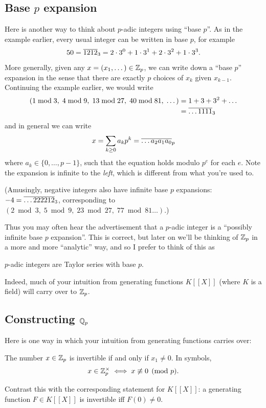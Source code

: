 \subsection{Base $p$ expansion}
Here is another way to think about $p$-adic integers using ``base $p$''.
As in the example earlier, every usual integer can be written in base $p$,
for example
\[ 50 = \overline{1212}_3 = 2 \cdot 3^0 + 1 \cdot 3^1 + 2 \cdot 3^2 + 1 \cdot 3^3. \]
More generally, given any $x = (x_1, \dots) \in \mathbb Z_p$,
we can write down a ``base $p$'' expansion in the sense
that there are exactly $p$ choices of $x_k$ given $x_{k-1}$.
Continuing the example earlier, we would write
\begin{align*}
	\left( 1 \bmod 3, \; 4 \bmod 9, \;
	13 \bmod{27}, \; 40 \bmod{81}, \; \dots \right)
	&= 1 + 3 + 3^2 + \dots \\
	&= \overline{\dots1111}_3
\end{align*}
and in general we can write
\[ x = \sum_{k \ge 0} a_k p^k = \overline{\dots a_2 a_1 a_0}_p \]
where $a_k \in \{0, \dots, p-1\}$,
such that the equation holds modulo $p^e$ for each $e$.
Note the expansion is infinite to the \emph{left},
which is different from what you're used to.

(Amusingly, negative integers also have infinite base $p$ expansions:
$-4 = \overline{\dots222212}_3$, corresponding to
$(2 \bmod 3, \; 5 \bmod 9, \; 23 \bmod{27}, \; 77 \bmod{81} \dots)$.)

Thus you may often hear the advertisement that a $p$-adic integer
is a ``possibly infinite base $p$ expansion''.
This is correct, but later on we'll be thinking of $\mathbb Z_p$ in
a more and more ``analytic'' way,
and so I prefer to think of this as
\begin{moral}
	$p$-adic integers are Taylor series with base $p$.
\end{moral}
Indeed, much of your intuition from generating functions $K[[X]]$
(where $K$ is a field) will carry over to $\mathbb Z_p$.

\subsection{Constructing $\mathbb Q_p$}
Here is one way in which your intuition from generating functions carries over:
\begin{proposition}
	The number $x \in \mathbb Z_p$ is invertible if and only if $x_1 \neq 0$.
	In symbols,
	\[ x \in \mathbb Z_p^\times \iff x \not\equiv 0 \pmod p. \]
\end{proposition}
Contrast this with the corresponding statement for $K[ [ X ] ]$:
a generating function $F \in K[ [ X ] ]$ is invertible iff $F(0) \neq 0$.

